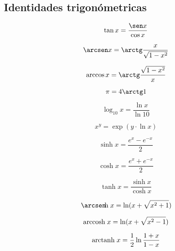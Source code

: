 \documentclass[12pt, a5paper]{article}
\begin{document}
\subsection*{Identidades trigonómetricas}
$$
\tan x = \dfrac{\sen x}{\cos x}
$$

$$
\arcsen x = \arctg \dfrac{x}{\sqrt{1 - x^2}}
$$

$$
\arccos x = \arctg \dfrac{\sqrt{1 - x^2}}{x}
$$

$$
\pi = 4 \arctg 1
$$

$$
\log_{10} x = \dfrac{\ln x}{\ln 10}
$$

$$
x^y = \exp (y \cdot \ln x)
$$

$$
\sinh x = \dfrac{ e^x - e^{-x}}{2}
$$

$$
\cosh x = \dfrac{ e^x + e^{-x}}{2}
$$

$$
\tanh x = \dfrac{\sinh x}{\cosh x}
$$

$$
\arcsen\negthinspace\text{h}\;x = \ln (x + \sqrt{x^2 + 1})
$$

$$
\arccos\negthinspace\text{h}\;x = \ln (x + \sqrt{x^2 - 1})
$$

$$
\arctan\negthinspace\text{h}\;x = \dfrac1{2} \ln \dfrac{1 + x}{1 - x}
$$
\end{document}
